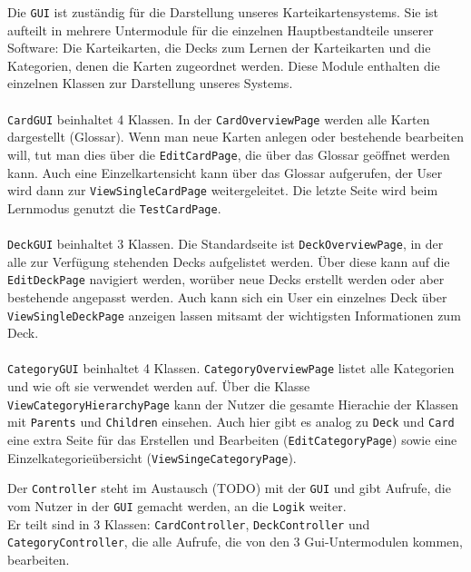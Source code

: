 \documentclass[fontsize=12pt,paper=A4,twoside]{scrartcl}
\begin{document}
    Die \texttt{GUI} ist zuständig für die Darstellung unseres Karteikartensystems.
    Sie ist aufteilt in mehrere Untermodule für die einzelnen Hauptbestandteile
    unserer Software: Die Karteikarten, die Decks zum Lernen der Karteikarten und die Kategorien,
    denen die Karten zugeordnet werden. Diese Module enthalten die einzelnen Klassen zur Darstellung
    unseres Systems.\\\\
     \texttt{CardGUI} beinhaltet 4 Klassen. In der \texttt{CardOverviewPage} werden
    alle Karten dargestellt (Glossar). Wenn man neue Karten anlegen oder bestehende bearbeiten will, tut
    man dies über die \texttt{EditCardPage}, die über das Glossar geöffnet werden kann. Auch eine Einzelkartensicht
    kann über das Glossar aufgerufen, der User wird dann zur \texttt{ViewSingleCardPage} weitergeleitet.
    Die letzte Seite wird beim Lernmodus genutzt die \texttt{TestCardPage}.\\\\
     \texttt{DeckGUI} beinhaltet 3 Klassen. Die Standardseite ist \texttt{DeckOverviewPage},
    in der alle zur Verfügung stehenden Decks aufgelistet werden. Über diese kann auf die \texttt{EditDeckPage}
    navigiert werden, worüber neue Decks erstellt werden oder aber bestehende angepasst werden. Auch kann sich ein
    User ein einzelnes Deck über \texttt{ViewSingleDeckPage} anzeigen lassen mitsamt der wichtigsten Informationen
    zum Deck.\\\\
     \texttt{CategoryGUI} beinhaltet 4 Klassen. \texttt{CategoryOverviewPage} listet alle Kategorien
    und wie oft sie verwendet werden auf. Über die Klasse \texttt{ViewCategoryHierarchyPage} kann
    der Nutzer die gesamte Hierachie der Klassen mit \texttt{Parents} und \texttt{Children} einsehen.
    Auch hier gibt es analog zu \texttt{Deck} und \texttt{Card} eine extra Seite für das Erstellen und Bearbeiten
    (\texttt{EditCategoryPage}) sowie eine Einzelkategorieübersicht (\texttt{ViewSingeCategoryPage}).

    Der \texttt{Controller} steht im Austausch (TODO) mit der \texttt{GUI} und gibt Aufrufe, die vom Nutzer
    in der \texttt{GUI} gemacht werden, an die \texttt{Logik} weiter.\\
    Er teilt sind in 3 Klassen: \texttt{CardController}, \texttt{DeckController} und \texttt{CategoryController}, die alle Aufrufe, die von den 3 Gui-Untermodulen kommen, bearbeiten.
\end{document}

